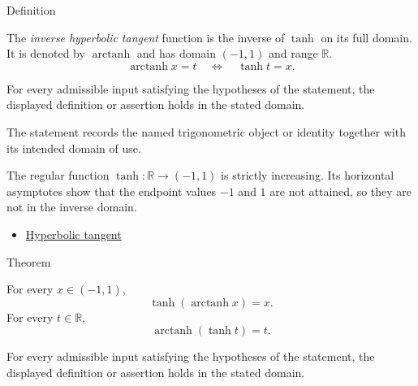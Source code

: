 

\begin{definitionbox}{Definition}
\begin{definition}
\label{def:inverse-hyperbolic-tangent}
The \emph{inverse hyperbolic tangent} function is the inverse of $\tanh$ on
its full domain. It is denoted by $\operatorname{arctanh}$ and has domain
$(-1,1)$ and range $\mathbb{R}$.
\[
  \operatorname{arctanh} x=t
  \quad\Longleftrightarrow\quad
  \tanh t=x.
\]
\end{definition}
\end{definitionbox}
\begin{remark*}
For every admissible input satisfying the hypotheses of the statement, the
displayed definition or assertion holds in the stated domain.
\end{remark*}

\begin{remark*}[Interpretation]
The statement records the named trigonometric object or identity together with
its intended domain of use.
\end{remark*}

\begin{remark*}
The regular function $\tanh:\mathbb{R}\to(-1,1)$ is strictly increasing.
Its horizontal asymptotes show that the endpoint values $-1$ and $1$ are not
attained, so they are not in the inverse domain.
\end{remark*}
\begin{dependencies}
\begin{itemize}
  \item \hyperref[def:hyperbolic-tangent]{Hyperbolic tangent}
\end{itemize}
\end{dependencies}

\begin{theorembox}{Theorem}
\begin{theorem}
\label{thm:inverse-hyperbolic-tangent-identities}
For every $x\in(-1,1)$,
\[
  \tanh(\operatorname{arctanh} x)=x.
\]
For every $t\in\mathbb{R}$,
\[
  \operatorname{arctanh}(\tanh t)=t.
\]
\end{theorem}
\end{theorembox}
\begin{remark*}
For every admissible input satisfying the hypotheses of the statement, the
displayed definition or assertion holds in the stated domain.
\end{remark*}

